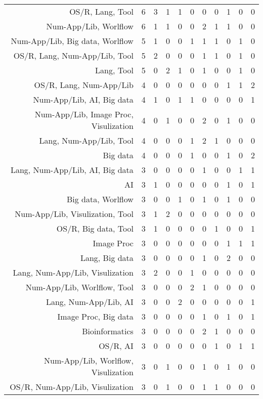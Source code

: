 {\begin{landscape}
\begin{longtable}[htb]{r|c|c|c|c|c|c|c|c|c|c}
{OS/R, Lang, Tool} & 6 & 3 & 1 & 1 & 0 & 0 & 0 & 1 & 0 & 0 \\%
{Num-App/Lib, Worlflow} & 6 & 1 & 1 & 0 & 0 & 2 & 1 & 1 & 0 & 0 \\%
{Num-App/Lib, Big data, Worlflow} & 5 & 1 & 0 & 0 & 1 & 1 & 1 & 0 & 1 & 0 \\%
{OS/R, Lang, Num-App/Lib, Tool} & 5 & 2 & 0 & 0 & 0 & 1 & 1 & 0 & 1 & 0 \\%
{Lang, Tool} & 5 & 0 & 2 & 1 & 0 & 1 & 0 & 0 & 1 & 0 \\%
{OS/R, Lang, Num-App/Lib} & 4 & 0 & 0 & 0 & 0 & 0 & 0 & 1 & 1 & 2 \\%
{Num-App/Lib, AI, Big data} & 4 & 1 & 0 & 1 & 1 & 0 & 0 & 0 & 0 & 1 \\%
{Num-App/Lib, Image Proc, Visulization} & 4 & 0 & 1 & 0 & 0 & 2 & 0 & 1 & 0 & 0 \\%
{Lang, Num-App/Lib, Tool} & 4 & 0 & 0 & 0 & 1 & 2 & 1 & 0 & 0 & 0 \\%
{Big data} & 4 & 0 & 0 & 0 & 1 & 0 & 0 & 1 & 0 & 2 \\%
{Lang, Num-App/Lib, AI, Big data} & 3 & 0 & 0 & 0 & 0 & 1 & 0 & 0 & 1 & 1 \\%
{AI} & 3 & 1 & 0 & 0 & 0 & 0 & 0 & 1 & 0 & 1 \\%
{Big data, Worlflow} & 3 & 0 & 0 & 1 & 0 & 1 & 0 & 1 & 0 & 0 \\%
{Num-App/Lib, Visulization, Tool} & 3 & 1 & 2 & 0 & 0 & 0 & 0 & 0 & 0 & 0 \\%
{OS/R, Big data, Tool} & 3 & 1 & 0 & 0 & 0 & 0 & 1 & 0 & 0 & 1 \\%
{Image Proc} & 3 & 0 & 0 & 0 & 0 & 0 & 0 & 1 & 1 & 1 \\%
{Lang, Big data} & 3 & 0 & 0 & 0 & 0 & 1 & 0 & 2 & 0 & 0 \\%
{Lang, Num-App/Lib, Visulization} & 3 & 2 & 0 & 0 & 1 & 0 & 0 & 0 & 0 & 0 \\%
{Num-App/Lib, Worlflow, Tool} & 3 & 0 & 0 & 0 & 2 & 1 & 0 & 0 & 0 & 0 \\%
{Lang, Num-App/Lib, AI} & 3 & 0 & 0 & 2 & 0 & 0 & 0 & 0 & 0 & 1 \\%
{Image Proc, Big data} & 3 & 0 & 0 & 0 & 0 & 1 & 0 & 1 & 0 & 1 \\%
{Bioinformatics} & 3 & 0 & 0 & 0 & 0 & 2 & 1 & 0 & 0 & 0 \\%
{OS/R, AI} & 3 & 0 & 0 & 0 & 0 & 0 & 1 & 0 & 1 & 1 \\%
{Num-App/Lib, Worlflow, Visulization} & 3 & 0 & 1 & 0 & 0 & 1 & 0 & 1 & 0 & 0 \\%
{OS/R, Num-App/Lib, Visulization} & 3 & 0 & 1 & 0 & 0 & 1 & 1 & 0 & 0 & 0 \\%

\end{longtable}
\end{landscape}}
